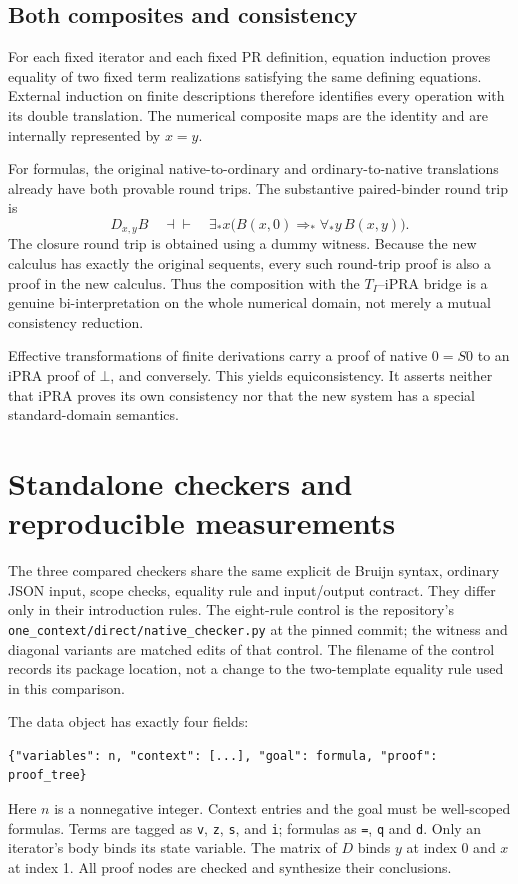 \documentclass[11pt]{article}
\theoremstyle{definition}
\theoremstyle{remark}
\begin{document}
\subsection{Both composites and consistency}

For each fixed iterator and each fixed PR definition, equation induction
proves equality of two fixed term realizations satisfying the same
defining equations.
External induction on finite descriptions therefore identifies every
operation with its double translation. The numerical composite maps are
the identity and are internally represented by \(x=y\).

For formulas, the original native-to-ordinary and ordinary-to-native
translations already have both provable round trips. The substantive
paired-binder round trip is
\[
 D_{x,y}B\quad\dashv\vdash\quad
 \exists_*x\bigl(B(x,0)\Rightarrow_*\forall_*y\,B(x,y)\bigr).
\]
The closure round trip is obtained using a dummy witness. Because the new
calculus has exactly the original sequents, every such round-trip proof
is also a proof in the new calculus. Thus the composition with the
\(T_I\)--iPRA bridge is a genuine bi-interpretation on the whole
numerical domain, not merely a mutual consistency reduction.

Effective transformations of finite derivations carry a proof of native
\(0=S0\) to an iPRA proof of \(\bot\), and conversely. This yields
equiconsistency. It asserts neither that iPRA proves its own consistency
nor that the new system has a special standard-domain semantics.

\section{Standalone checkers and reproducible measurements}
\label{sec:implementation}

The three compared checkers share the same explicit de Bruijn syntax,
ordinary JSON input, scope checks, equality rule and input/output contract.
They differ only in their introduction rules. The eight-rule control is
the repository's \texttt{one\_context/direct/native\_checker.py} at the
pinned commit; the witness and diagonal variants are matched edits of that
control. The filename of the control records its package location, not a
change to the two-template equality rule used in this comparison.

The data object has exactly four fields:
\begin{lstlisting}
{"variables": n, "context": [...], "goal": formula, "proof": proof_tree}
\end{lstlisting}
Here \(n\) is a nonnegative integer. Context entries and the goal must be
well-scoped formulas. Terms are tagged as \texttt{v}, \texttt{z},
\texttt{s}, and \texttt{i}; formulas as \texttt{=}, \texttt{q} and
\texttt{d}. Only an iterator's body binds its state variable.
The matrix of \(D\) binds \(y\) at index 0 and \(x\) at index 1.
All proof nodes are checked and synthesize their conclusions.
\end{document}
